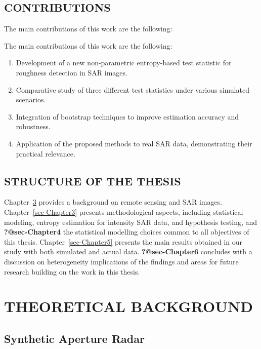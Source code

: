 \documentclass[
  letterpaper,
  11pt,
  english,
  doublespacing,
  headsepline,
  consistentlayout,
  oneside,
  openany]{MastersDoctoralThesis}
\providecommand{\tightlist}{%
  \setlength{\itemsep}{0pt}\setlength{\parskip}{0pt}}\usepackage{longtable,booktabs,array}
\begin{document}
\section{CONTRIBUTIONS}\label{contributions}

The main contributions of this work are the following:

The main contributions of this work are the following:

\begin{enumerate}
\def\labelenumi{\arabic{enumi}.}
\tightlist
\item
  Development of a new non-parametric entropy-based test statistic for
  roughness detection in SAR images.
\item
  Comparative study of three different test statistics under various
  simulated scenarios.
\item
  Integration of bootstrap techniques to improve estimation accuracy and
  robustness.
\item
  Application of the proposed methods to real SAR data, demonstrating
  their practical relevance.
\end{enumerate}

\section{STRUCTURE OF THE THESIS}\label{structure-of-the-thesis}

Chapter~\ref{sec-Chapter2} provides a background on remote sensing and
SAR images. Chapter~\ref{sec-Chapter3} presents methodological aspects,
including statistical modeling, entropy estimation for intensity SAR
data, and hypothesis testing, and \textbf{?@sec-Chapter4} the
statistical modelling choices common to all objectives of this thesis.
Chapter~\ref{sec-Chapter5} presents the main results obtained in our
study with both simulated and actual data. \textbf{?@sec-Chapter6}
concludes with a discussion on heterogeneity implications of the
findings and areas for future research building on the work in this
thesis.


\chapter{THEORETICAL BACKGROUND}\label{sec-Chapter2}

\section{Synthetic Aperture Radar}\label{synthetic-aperture-radar}
\end{document}
